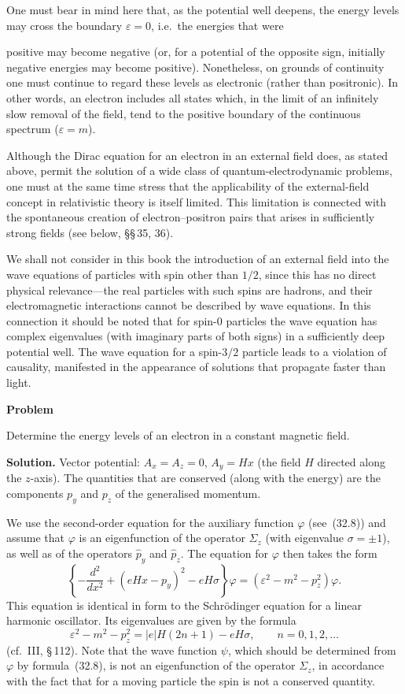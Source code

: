 One must bear in mind here that, as the potential well deepens, the energy levels may cross the boundary $\varepsilon = 0$, i.e.\ the energies that were

positive may become negative (or, for a potential of the opposite sign, initially negative energies may become positive). Nonetheless, on grounds of continuity one must continue to regard these levels as electronic (rather than positronic). In other words, an electron includes all states which, in the limit of an infinitely slow removal of the field, tend to the positive boundary of the continuous spectrum ($\varepsilon = m$).

Although the Dirac equation for an electron in an external field does, as stated above, permit the solution of a wide class of quantum-electrodynamic problems, one must at the same time stress that the applicability of the external-field concept in relativistic theory is itself limited. This limitation is connected with the spontaneous creation of electron--positron pairs that arises in sufficiently strong fields (see below, \S\S\,35, 36).

We shall not consider in this book the introduction of an external field into the wave equations of particles with spin other than $1/2$, since this has no direct physical relevance---the real particles with such spins are hadrons, and their electromagnetic interactions cannot be described by wave equations. In this connection it should be noted that for spin-0 particles the wave equation has complex eigenvalues (with imaginary parts of both signs) in a sufficiently deep potential well. The wave equation for a spin-$3/2$ particle leads to a violation of causality, manifested in the appearance of solutions that propagate faster than light.

\begin{center}
\textbf{Problem}
\end{center}

Determine the energy levels of an electron in a constant magnetic field.

\textbf{Solution.} Vector potential: $A_x = A_z = 0$, $A_y = Hx$ (the field $H$ directed along the $z$-axis). The quantities that are conserved (along with the energy) are the components $p_y$ and $p_z$ of the generalised momentum.

We use the second-order equation for the auxiliary function $\varphi$ (see~(32.8)) and assume that $\varphi$ is an eigenfunction of the operator $\Sigma_z$ (with eigenvalue $\sigma = \pm 1$), as well as of the operators $\widehat p_y$ and $\widehat p_z$. The equation for $\varphi$ then takes the form
\[
\left\{-\frac{d^2}{dx^2} + (eHx - p_y)^2 - eH\sigma\right\}\varphi = (\varepsilon^2 - m^2 - p_z^2)\varphi.
\]
This equation is identical in form to the Schr\"odinger equation for a linear harmonic oscillator. Its eigenvalues are given by the formula
\[
\varepsilon^2 - m^2 - p_z^2 = |e|H(2n+1) - eH\sigma,\qquad n = 0, 1, 2,\ldots
\]
(cf.\ III, \S\,112). Note that the wave function $\psi$, which should be determined from $\varphi$ by formula~(32.8), is not an eigenfunction of the operator $\Sigma_z$, in accordance with the fact that for a moving particle the spin is not a conserved quantity.
